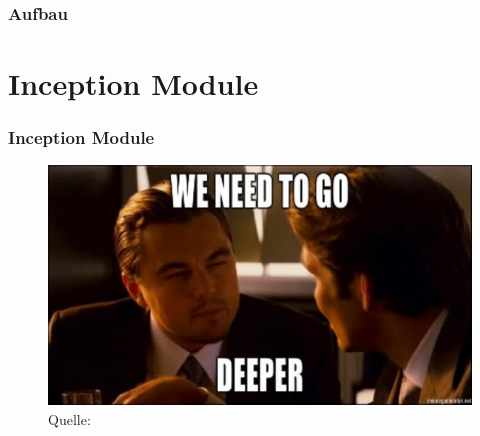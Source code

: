 \documentclass{beamer}
\begin{document}
\begin{frame}
	\frametitle{Aufbau}
\end{frame}

\section{Inception Module}

\begin{frame}
	\frametitle{Inception Module}
	\begin{figure}
		\includegraphics[width=0.8\linewidth]{images/inception_meme.jpg}\\
		\hspace*{0pt}\hbox{\scriptsize Quelle:}
	\end{figure}
	
\end{frame}
\end{document}
